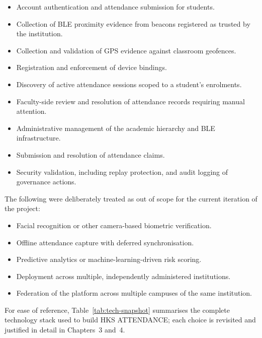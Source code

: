 \documentclass[12pt, a4paper, oneside]{report}
\begin{document}
\begin{itemize}
    \item Account authentication and attendance submission for students.
    \item Collection of BLE proximity evidence from beacons registered as trusted by the institution.
    \item Collection and validation of GPS evidence against classroom geofences.
    \item Registration and enforcement of device bindings.
    \item Discovery of active attendance sessions scoped to a student's enrolments.
    \item Faculty-side review and resolution of attendance records requiring manual attention.
    \item Administrative management of the academic hierarchy and BLE infrastructure.
    \item Submission and resolution of attendance claims.
    \item Security validation, including replay protection, and audit logging of governance actions.
\end{itemize}

The following were deliberately treated as out of scope for the current iteration of the project:

\begin{itemize}
    \item Facial recognition or other camera-based biometric verification.
    \item Offline attendance capture with deferred synchronisation.
    \item Predictive analytics or machine-learning-driven risk scoring.
    \item Deployment across multiple, independently administered institutions.
    \item Federation of the platform across multiple campuses of the same institution.
\end{itemize}

For ease of reference, Table~\ref{tab:tech-snapshot} summarises the complete technology stack used to build HKS ATTENDANCE; each choice is revisited and justified in detail in Chapters~3 and~4.
\end{document}
